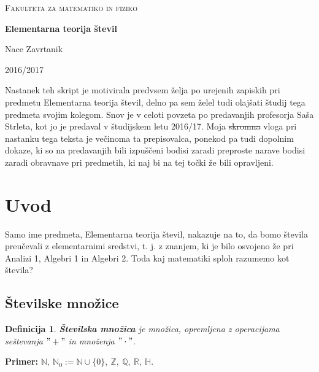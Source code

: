 \documentclass[12pt, a4paper]{article}
\newtheorem{defi}{Definicija}
\newenvironment{prim}[1][]{\par\medskip\noindent \textbf{Primer: }}{\medskip}
\begin{document}
\begin{titlepage}
	\centering
	
	{\scshape\Large Fakulteta za matematiko in fiziko \par}
	\vspace{2cm}

	{\Huge\bfseries Elementarna teorija števil\par}
	\vspace{2cm}
	{\Large Nace Zavrtanik\par}
	
	\vfill

	{\large 2016/2017\par}
\end{titlepage}
\noindent Nastanek teh skript je motivirala predvsem želja po urejenih zapiskih pri predmetu Elementarna teorija števil, delno pa sem želel tudi olajšati študij tega predmeta svojim kolegom. Snov je v celoti povzeta po predavanjih profesorja Saša Strleta, kot jo je predaval v študijskem letu 2016/17. Moja \sout{skromna} vloga pri nastanku tega teksta je večinoma ta prepisovalca, ponekod pa tudi dopolnim dokaze, ki so na predavanjih bili izpuščeni bodisi zaradi preproste narave bodisi zaradi obravnave pri predmetih, ki naj bi na tej točki že bili opravljeni.

\newpage

	\tableofcontents
	\newpage

\section{Uvod}

Samo ime predmeta, Elementarna teorija števil, nakazuje na to, da bomo števila preučevali z elementarnimi sredstvi, t. j. z znanjem, ki je bilo osvojeno že pri Analizi 1, Algebri 1 in Algebri 2. Toda kaj matematiki sploh razumemo kot števila?

\subsection{Številske množice}

\begin{defi}
\textbf{Številska množica} je množica, opremljena z operacijama seštevanja $"+"$ in množenja $"\cdot "$.
\end{defi}

\begin{prim}
 $\mathbb{N},\ \mathbb{N}_{0}:=\mathbb{N} \cup \{ 0 \},\ \mathbb{Z} ,\ \mathbb{Q} ,\ \mathbb{R} ,\ \mathbb{H}.$
\end{prim}
\end{document}
